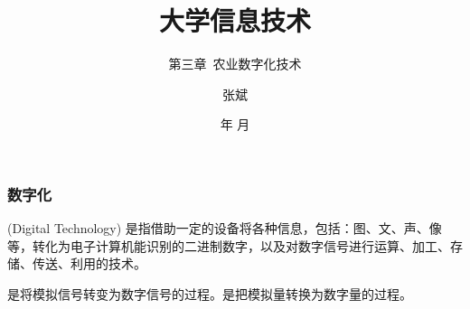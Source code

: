 \documentclass[dvipsnames, svgnames, x11names]{beamer}
\title{大学信息技术}
\subtitle{第三章\ 农业数字化技术}
\author{张斌}
\institute[理工系]{河北农业大学 理工系}
\date{\the\year 年 \the\month 月}
\begin{document}
\maketitle

\begin{frame}
    \frametitle{数字化}
     (Digital Technology) 是指借助一定的设备将各种信息，包括：图、文、声、像等，转化为电子计算机能识别的二进制数字，以及对数字信号进行运算、加工、存储、传送、利用的技术。
  \bigskip

  是将模拟信号转变为数字信号的过程。是把模拟量转换为数字量的过程。

\end{frame}

\begin{frame}{}
  \begin{center}
      {\Huge {}}
  \end{center}
  \tableofcontents[subsectionstyle=hide/hide/show]
  \thispagestyle{empty}
  \addtocounter{framenumber}{-1}
\end{frame}





\end{document}
